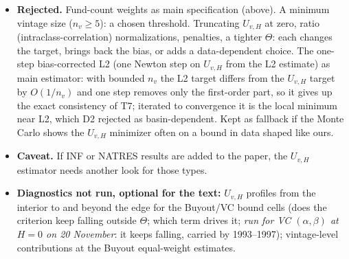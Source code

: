 \documentclass[11pt]{article}
\begin{document}
\begin{itemize}
\item \textbf{Rejected.} Fund-count weights as main specification (above). A minimum vintage size ($n_v\ge5$): a chosen threshold. Truncating $U_{v,H}$ at zero, ratio (intraclass-correlation) normalizations, penalties, a tighter $\Theta$: each changes the target, brings back the bias, or adds a data-dependent choice. The one-step bias-corrected L2 (one Newton step on $U_{v,H}$ from the L2 estimate) as main estimator: with bounded $n_v$ the L2 target differs from the $U_{v,H}$ target by $O(1/n_v)$ and one step removes only the first-order part, so it gives up the exact consistency of T7; iterated to convergence it is the local minimum near L2, which D2 rejected as basin-dependent. Kept as fallback if the Monte Carlo shows the $U_{v,H}$ minimizer often on a bound in data shaped like ours.
\item \textbf{Caveat.} If INF or NATRES results are added to the paper, the $U_{v,H}$ estimator needs another look for those types.
\item \textbf{Diagnostics not run, optional for the text:} $U_{v,H}$ profiles from the interior to and beyond the edge for the Buyout/VC bound cells (does the criterion keep falling outside $\Theta$; which term drives it; \emph{run for VC $(\alpha,\beta)$ at $H=0$ on 20 November}: it keeps falling, carried by 1993--1997); vintage-level contributions at the Buyout equal-weight estimates.
\end{itemize}
\end{document}
